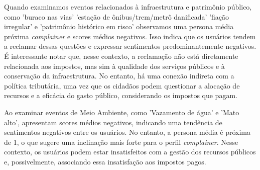 Quando examinamos eventos relacionados à infraestrutura e patrimônio público, como 'buraco nas vias' 'estação de ônibus/trem/metrô danificada' 'fiação irregular' e 'patrimônio histórico em risco' observamos uma persona média próxima \textit{complainer} e scores médios negativos. Isso indica que os usuários tendem a reclamar dessas questões e expressar sentimentos predominantemente negativos. É interessante notar que, nesse contexto, a reclamação não está diretamente relacionada aos impostos, mas sim à qualidade dos serviços públicos e à conservação da infraestrutura. No entanto, há uma conexão indireta com a política tributária, uma vez que os cidadãos podem questionar a alocação de recursos e a eficácia do gasto público, considerando os impostos que pagam.

Ao examinar eventos de Meio Ambiente, como 'Vazamento de água' e 'Mato alto', apresentam scores médios negativos, indicando uma tendência de sentimentos negativos entre os usuários. No entanto, a persona média é próxima de 1, o que sugere uma inclinação mais forte para o perfil \textit{complainer}. Nesse contexto, os usuários podem estar insatisfeitos com a gestão dos recursos públicos e, possivelmente, associando essa insatisfação aos impostos pagos.


